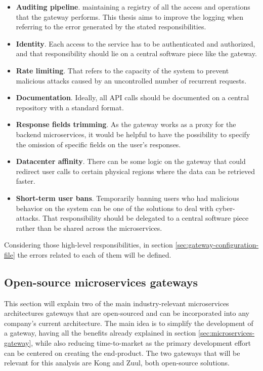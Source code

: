 \documentclass[english, 12pt, a4paper, sci, utf8, a-1b, online]{aaltothesis}
\begin{document}
\begin{itemize}
    \item \textbf{Auditing pipeline}. maintaining a registry of all the access and operations that the gateway performs. This thesis aims to improve the logging when referring to the error generated by the stated responsibilities.
    \item \textbf{Identity}. Each access to the service has to be authenticated and authorized, and that responsibility should lie on a central software piece like the gateway.
    \item \textbf{Rate limiting}. That refers to the capacity of the system to prevent malicious attacks caused by an uncontrolled number of recurrent requests.
    \item \textbf{Documentation}. Ideally, all API calls should be documented on a central repository with a standard format.
    \item \textbf{Response fields trimming}. As the gateway works as a proxy for the backend microservices, it would be helpful to have the possibility to specify the omission of specific fields on the user's responses.
    \item \textbf{Datacenter affinity}. There can be some logic on the gateway that could redirect user calls to certain physical regions where the data can be retrieved faster.
    \item \textbf{Short-term user bans}. Temporarily banning users who had malicious behavior on the system can be one of the solutions to deal with cyber-attacks. That responsibility should be delegated to a central software piece rather than be shared across the microservices.
\end{itemize}

Considering those high-level responsibilities, in section \ref{sec:gateway-configuration-file} the errors related to each of them will be defined.

\subsection{Open-source microservices gateways}
\label{sec:industry-gateways}

This section will explain two of the main industry-relevant microservices architectures gateways that are open-sourced and can be incorporated into any company's current architecture. The main idea is to simplify the development of a gateway, having all the benefits already explained in section \ref{sec:microservices-gateway}, while also reducing time-to-market as the primary development effort can be centered on creating the end-product. The two gateways that will be relevant for this analysis are Kong and Zuul, both open-source solutions.
\end{document}
